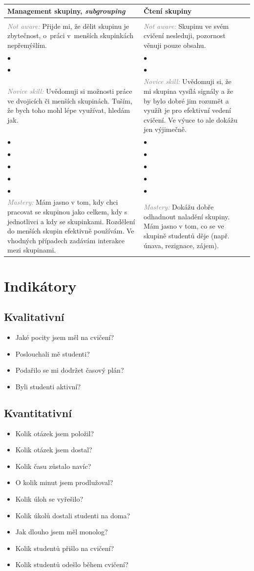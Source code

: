 \documentclass[twoside,openany,10pt]{book}
\makeatletter
\newcommand{\note}[1]{\textcolor{gray}{\small\itshape #1}}
\newcommand{\rubricpage}[8]{
\newpage
\begin{tabular}{@{}>{\small}C{0.48\textwidth}>{\small}C{0.48\textwidth}@{}l@{}}
\normalsize \bfseries #1 & \normalsize \bfseries #5 & \\[1em] \hline \\[-1.2em]
\justify \note{Not aware:} #2 & \justify \note{Not aware:} #6 & \\[2em]
$\bullet$ & $\bullet$ & \\
$\bullet$ & $\bullet$ & \\
\justify \note{Novice skill:} #3 & \justify \note{Novice skill:} #7 & \\[3em]
$\bullet$ & $\bullet$ & \\
$\bullet$ & $\bullet$ & \\
$\bullet$ & $\bullet$ & \\
$\bullet$ & $\bullet$ & \\
$\bullet$ & $\bullet$ & \\
\justify \note{Mastery:} #4 & \justify \note{Mastery:} #8 &
\end{tabular}
}
\makeatother
\begin{document}
\rubricpage{Management skupiny, \textit{subgrouping}}
{Přijde mi, že dělit skupinu je zbytečnost, o~práci v~menších skupinkách nepřemýšlím.}
{Uvědomuji si možnosti práce ve dvojicích či menších skupinách. Tuším, že bych toho mohl lépe využívat, hledám jak.}
{Mám jasno v tom, kdy chci pracovat se skupinou jako celkem, kdy s jednotlivci a kdy se skupinkami. Rozdělení do menších skupin efektivně používám. Ve vhodných případech zadávám interakce mezi skupinami.}
{Čtení skupiny}
{Skupinu ve svém cvičení nesleduji, pozornost věnuji pouze obsahu.}
{Uvědomuji si, že mi skupina vysílá signály a že by bylo dobré jim rozumět a využít je pro efektivní vedení cvičení. Ve výuce to ale dokážu jen výjimečně.}
{Dokážu dobře odhadnout naladění skupiny. Mám jasno v tom, co se ve skupině studentů děje (např. únava, rezignace, zájem).}

\chapter*{Indikátory}
\label{indikatory}

\section*{Kvalitativní}
\begin{itemize}
\item Jaké pocity jsem měl na cvičení?
\item Poslouchali mě studenti?
\item Podařilo se mi dodržet časový plán?
\item Byli studenti aktivní?
\end{itemize}

\section*{Kvantitativní}
\begin{itemize}
\item Kolik otázek jsem položil?
\item Kolik otázek jsem dostal?
\item Kolik času zůstalo navíc?
\item O kolik minut jsem prodlužoval?
\item Kolik úloh se vyřešilo?
\item Kolik úkolů dostali studenti na doma?
\item Jak dlouho jsem měl monolog?
\item Kolik studentů přišlo na cvičení?
\item Kolik studentů odešlo během cvičení?
\end{itemize}
\newpage
\end{document}
